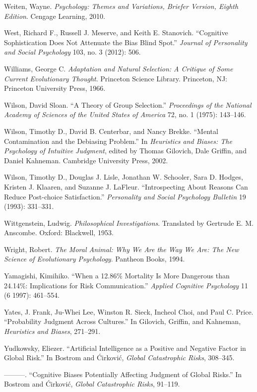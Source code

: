 \documentclass[letterpaper]{book}
\begin{document}
{
 Weiten, Wayne. \textit{Psychology: Themes and Variations, Briefer
Version, Eighth Edition}. Cengage Learning, 2010.}

{
 West, Richard F., Russell J. Meserve, and Keith E. Stanovich.
``Cognitive Sophistication Does Not Attenuate the Bias
Blind Spot.'' \textit{Journal of Personality and
Social Psychology} 103, no. 3 (2012): 506.}

{
 Williams, George C. \textit{Adaptation and Natural Selection: A
Critique of Some Current Evolutionary Thought}. Princeton Science
Library. Princeton, NJ: Princeton University Press, 1966.}

{
 Wilson, David Sloan. ``A Theory of Group
Selection.'' \textit{Proceedings of the National
Academy of Sciences of the United States of America} 72, no. 1 (1975):
143--146.}

{
 Wilson, Timothy D., David B. Centerbar, and Nancy Brekke.
``Mental Contamination and the Debiasing
Problem.'' In \textit{Heuristics and Biases: The
Psychology of Intuitive Judgment}, edited by Thomas Gilovich, Dale
Griffin, and Daniel Kahneman. Cambridge University Press, 2002.}

{
 Wilson, Timothy D., Douglas J. Lisle, Jonathan W. Schooler, Sara
D. Hodges, Kristen J. Klaaren, and Suzanne J. LaFleur.
``Introspecting About Reasons Can Reduce Post-choice
Satisfaction.'' \textit{Personality and Social
Psychology Bulletin} 19 (1993): 331--331.}

{
 Wittgenstein, Ludwig. \textit{Philosophical Investigations}.
Translated by Gertrude E. M. Anscombe. Oxford: Blackwell, 1953.}

{
 Wright, Robert. \textit{The Moral Animal: Why We Are the Way We
Are: The New Science of Evolutionary Psychology}. Pantheon Books,
1994.}

{
 Yamagishi, Kimihiko. ``When a 12.86\% Mortality
Is More Dangerous than 24.14\%: Implications for Risk
Communication.'' \textit{Applied Cognitive
Psychology} 11 (6 1997): 461--554.}

{
 Yates, J. Frank, Ju-Whei Lee, Winston R. Sieck, Incheol Choi, and
Paul C. Price. ``Probability Judgment Across
Cultures.'' In Gilovich, Griffin, and Kahneman,
\textit{Heuristics and Biases}, 271--291.}

{
 Yudkowsky, Eliezer. ``Artificial Intelligence as
a Positive and Negative Factor in Global Risk.'' In
Bostrom and \'Cirkovi\'c, \textit{Global Catastrophic Risks},
308--345.}

{
 {}---{}---{}---. ``Cognitive Biases Potentially
Affecting Judgment of Global Risks.'' In Bostrom and
\'Cirkovi\'c, \textit{Global Catastrophic Risks}, 91--119.}
\end{document}

